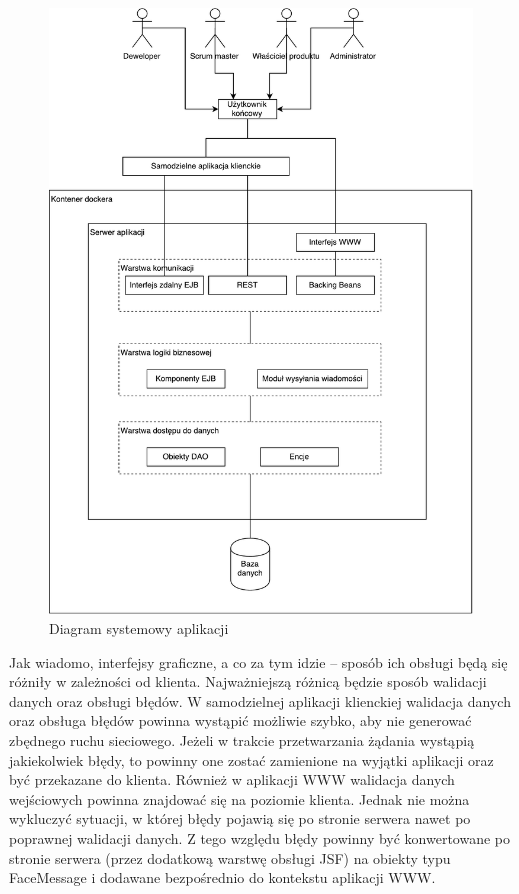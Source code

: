 \begin{figure}[h!]
	\centering
	\includegraphics[width=13.5cm]{rysunki/diagsys.pdf}	
	\caption{Diagram systemowy aplikacji}
	\label{fig:diagsys}
\end{figure}

Jak wiadomo, interfejsy graficzne, a co za tym idzie – sposób ich obsługi będą się różniły w zależności od klienta. Najważniejszą różnicą będzie sposób walidacji danych oraz obsługi błędów. W samodzielnej aplikacji klienckiej walidacja danych oraz obsługa błędów powinna wystąpić możliwie szybko, aby nie generować zbędnego ruchu sieciowego. Jeżeli w trakcie przetwarzania żądania wystąpią jakiekolwiek błędy, to powinny one zostać zamienione na wyjątki aplikacji oraz być przekazane do klienta. Również w aplikacji WWW walidacja danych wejściowych powinna znajdować się na poziomie klienta. Jednak nie można wykluczyć sytuacji, w której błędy pojawią się po stronie serwera nawet po poprawnej walidacji danych. Z tego względu błędy powinny być konwertowane po stronie serwera (przez dodatkową warstwę obsługi JSF) na obiekty typu FaceMessage i dodawane bezpośrednio do kontekstu aplikacji WWW. 


